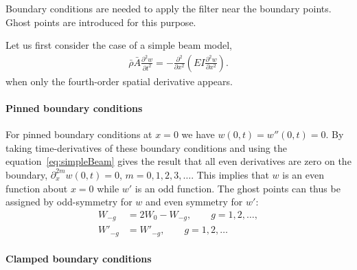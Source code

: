 \documentclass[11pt]{article}
\newcommand{\rhos}{\bar{\rho}}
\newcommand{\As}{\bar{A}}
\begin{document}
Boundary conditions are needed to apply the filter near the boundary points.
Ghost points are introduced for this purpose.

Let us first consider the case of a simple beam model,
\begin{align}
  \rhos \As \frac{\partial^2 w}{\partial t^2} = 
                   - \frac{\partial^2}{\partial x^2}\left( E I \frac{\partial^2 w}{\partial x^2}\right) . \label{eq:simpleBeam}
\end{align}
when only the fourth-order spatial derivative appears.

\paragraph{Pinned boundary conditions}
For pinned boundary conditions at $x=0$ we have $w(0,t)=w''(0,t)=0$. 
By taking time-derivatives of these boundary conditions and using the equation~\eqref{eq:simpleBeam}
gives the result that all even derivatives are zero on the boundary, $\partial_x^{2m} w(0,t)=0$, $m=0,1,2,3,\ldots$.
This implies that $w$ is an even function about $x=0$ while $w'$ is an odd function.
The ghost points can thus be assigned by odd-symmetry for $w$ and even symmetry for $w'$:
\begin{align}
  W_{-g} &= 2 W_0 - W_{-g}, \qquad g=1,2,\ldots, \\
  W'_{-g} &= W'_{-g}, \qquad g=1,2,\ldots
\end{align}


\paragraph{Clamped boundary conditions}
\end{document}
